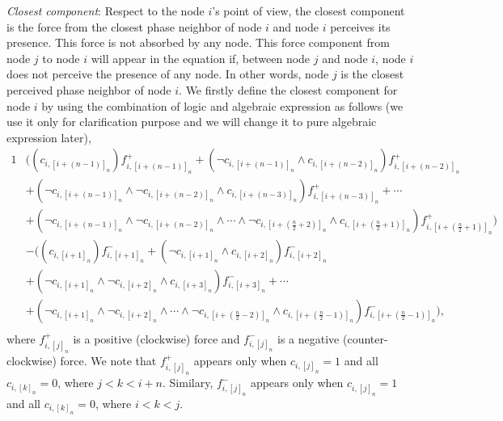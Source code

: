 \textit{Closest component}:
Respect to the node $i$'s point of view, the closest component is the force from the closest phase neighbor of node $i$ and node $i$ perceives its presence. This force is not absorbed by any node. This force component from node $j$ to node $i$ will appear in the equation if, between node $j$ and node $i$, node $i$ does not perceive the presence of any node. In other words, node $j$ is the closest perceived phase neighbor of node $i$. We firstly define the closest component for node $i$ by using the combination of logic and algebraic expression as follows (we use it only for clarification purpose and we will change it to pure algebraic expression later),
\begin{alignat}{1}
& \Bigg((c_{i,[i+(n-1)]_n})f_{i,[i+(n-1)]_n}^{+} + (\lnot c_{i,[i+(n-1)]_n} \land c_{i,[i+(n-2)]_n})f_{i,[i+(n-2)]_n}^{+} \nonumber \\
&+ (\neg c_{i,[i+(n-1)]_n}\land \neg c_{i,[i+(n-2)]_n} \land c_{i,[i+(n-3)]_n})f_{i,[i+(n-3)]_n}^{+} + \cdots  \nonumber \\
&+ (\neg c_{i,[i+(n-1)]_n}\land \neg c_{i,[i+(n-2)]_n} \land \cdots \land \neg c_{i,[i+(\frac{n}{2}+2)]_n} \land c_{i,[i+(\frac{n}{2}+1)]_n})f_{i, [i + (\frac{n}{2}+1)]_n}^{+}\Bigg) \nonumber \\
&-\Bigg((c_{i,[i+1]_n})f_{i,[i+1]_n}^{-} + (\lnot c_{i,[i+1]_n} \land c_{i,[i+2]_n})f_{i,[i+2]_n}^{-} \nonumber \\
&+ (\neg c_{i,[i+1]_n}\land \neg c_{i,[i+2]_n} \land c_{i,[i+3]_n})f_{i,[i+3]_n}^{-} + \cdots \nonumber \\
&+ (\neg c_{i,[i+1]_n}\land \neg c_{i,[i+2]_n} \land \cdots \land \neg c_{i,[i+(\frac{n}{2}-2)]_n} \land c_{i,[i+(\frac{n}{2}-1)]_n})f_{i, [i + (\frac{n}{2}-1)]_n}^{-}\Bigg),\nonumber \\
\label{eq:closest}
\end{alignat}
where $f_{i,[j]_n}^{+}$ is a positive (clockwise) force and $f_{i,[j]_n}^{-}$ is a negative (counter-clockwise) force.
We note that $f_{i,[j]_n}^{+}$ appears only when $c_{i,[j]_n} = 1$ and all $c_{i,[k]_n} = 0$, where  $j< k < i + n$. Similary, $f_{i,[j]_n}^{-}$ appears only when $c_{i,[j]_n} = 1$ and all $c_{i,[k]_n} = 0$, where  $i< k < j$.

